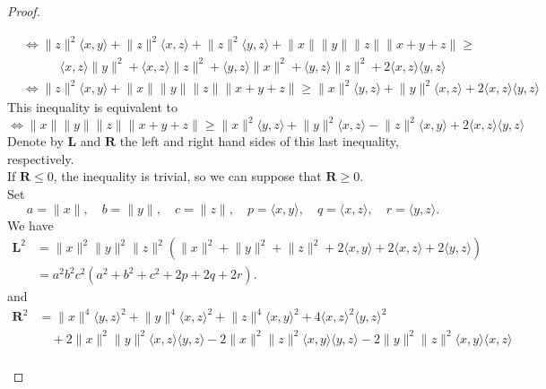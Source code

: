 \documentclass[a4paper,10pt]{article}
\theoremstyle{plain}
\theoremstyle{definition}
\theoremstyle{remark}
\begin{document}
\begin{proof}
\begin{itemize}
\begin{align*}
&\Leftrightarrow \lVert z \rVert^2 \langle x , y \rangle +  \lVert z \rVert^2 \langle x , z \rangle +  \lVert z \rVert^2 \langle y , z \rangle + \lVert x \rVert \lVert y \rVert \lVert z \rVert \lVert x + y + z \rVert \geq \\
&\quad \quad \quad \langle x , z \rangle \lVert y \rVert^2 + \langle x , z \rangle \lVert z \rVert^2 +  \langle y , z \rangle \lVert x \rVert^2 + \langle y , z \rangle \lVert z \rVert^2 + 2 \langle x , z \rangle \langle y , z \rangle \\
&\Leftrightarrow \lVert z \rVert^2 \langle x , y \rangle + \lVert x \rVert \lVert y \rVert \lVert z \rVert \lVert x + y + z \rVert \geq \lVert x \rVert^2 \langle y , z \rangle + \lVert y \rVert^2 \langle x , z \rangle + 2 \langle x , z \rangle \langle y , z \rangle
\end{align*}
This inequality is equivalent to
\[ \Leftrightarrow \lVert x \rVert \lVert y \rVert \lVert z \rVert \lVert x + y + z \rVert \geq \lVert x \rVert^2 \langle y , z \rangle + \lVert y \rVert^2 \langle x , z \rangle - \lVert z \rVert^2 \langle x , y \rangle + 2 \langle x , z \rangle \langle y , z \rangle \]
Denote by $\textbf{L}$ and $\textbf{R}$ the left and right hand sides of this last inequality, respectively. \\
If $\textbf{R} \leq 0$, the inequality is trivial, so we can suppose that $\textbf{R} \geq 0$. \\
Set 
\[ a = \lVert x \rVert, \quad b = \lVert y \rVert, \quad c = \lVert z \rVert, \quad p = \langle x,y \rangle, \quad q = \langle x,z \rangle, \quad r = \langle y,z \rangle. \]
We have 
\begin{align*}
\textbf{L}^2 &=  \lVert x \rVert^2  \lVert y \rVert^2  \lVert z \rVert^2  \left( \lVert x \rVert^2 + \lVert y \rVert^2  + \lVert z \rVert^2 + 2  \langle x , y \rangle + 2 \langle x , z \rangle +  2 \langle y , z \rangle \right) \\
&= a^2 b^2 c^2 (a^2 + b^2 + c^2 + 2p + 2q + 2r).
\end{align*}
and
\begin{align*}
\textbf{R}^2 &= \lVert x \rVert^4 \langle y , z \rangle^2 +  \lVert y \rVert^4 \langle x , z \rangle^2 +  \lVert z \rVert^4 \langle x , y \rangle^2 +  4 \langle x , z \rangle^2 \langle y , z \rangle^2 \\
&\quad + 2 \lVert x \rVert^2 \lVert y \rVert^2 \langle x , z \rangle \langle y , z \rangle - 2 \lVert x \rVert^2 \lVert z \rVert^2  \langle x , y \rangle  \langle y , z \rangle   - 2 \lVert y \rVert^2 \lVert z \rVert^2 \langle x , y \rangle  \langle x , z \rangle   \\

\end{align*}
\end{itemize}
\end{proof}
\end{document}
